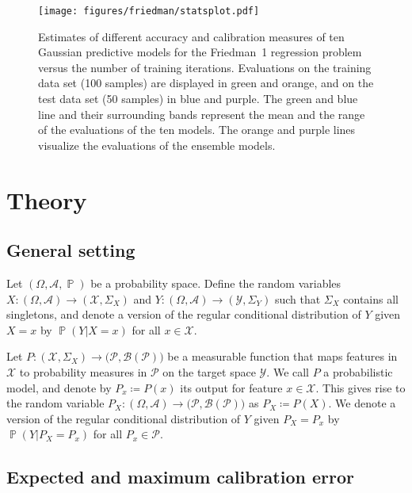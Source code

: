 \documentclass{article}
\DeclareMathOperator{\Prob}{\mathbb{P}}
\begin{document}
\begin{figure}[htp]
    \begin{center}
        \texttt{[image: figures/friedman/statsplot.pdf]}
        \caption{Estimates of different accuracy and calibration measures of ten
        Gaussian predictive models for the Friedman~1 regression problem versus
        the number of training iterations.
        Evaluations on the training data set (100 samples) are displayed in green
        and orange, and on the test data set (50 samples) in blue and purple.
        The green and blue line and their surrounding bands represent
        the mean and the range of the evaluations of the ten models. The orange and
        purple lines visualize the evaluations of the ensemble models.}
        \label{fig:friedman1}
    \end{center}
\end{figure}

\section{Theory}
\label{app:theory}

\subsection{General setting}

Let $(\Omega, \mathcal{A}, \Prob)$ be a probability space. Define the random
variables $X \colon (\Omega, \mathcal{A}) \to (\mathcal{X}, \Sigma_X)$
and $Y \colon (\Omega, \mathcal{A}) \to (\mathcal{Y}, \Sigma_Y)$
such that $\Sigma_X$ contains all singletons, and denote a version of the regular
conditional distribution of $Y$ given $X = x$ by $\Prob(Y|X = x)$ for all
$x \in \mathcal{X}$.

Let $P \colon (\mathcal{X}, \Sigma_X) \to \big(\mathcal{P}, \mathcal{B}(\mathcal{P})\big)$
be a measurable function that maps features in $\mathcal{X}$ to
probability measures in $\mathcal{P}$ on the target space $\mathcal{Y}$.
We call $P$ a probabilistic model, and denote by $P_x \coloneqq P(x)$ its
output for feature $x \in \mathcal{X}$. This gives rise to the random
variable $P_X \colon (\Omega, \mathcal{A}) \to \big(\mathcal{P}, \mathcal{B}(\mathcal{P})\big)$
as $P_X \coloneqq P(X)$. We denote a version of the regular conditional distribution
of $Y$ given $P_X = P_x$ by $\Prob(Y| P_X = P_x)$ for all $P_x \in \mathcal{P}$.

\subsection{Expected and maximum calibration error}
\label{app:ece_mce}
\end{document}
